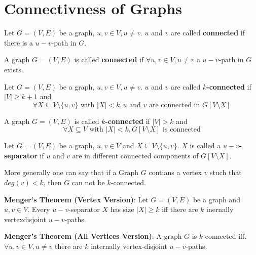 \section{Connectivness of Graphs}

\begin{definition}
	Let $G = (V, E)$ be a graph, $u, v \in V, u \neq v$. $u$ and $v$ are called \textbf{connected} if there is a $u-v$-path in $G$.
\end{definition}

\begin{definition}
	A graph $G = (V, E)$ is called \textbf{connected} if $\forall u, v \in V, u \neq v$ a $u-v$-path in $G$ exists.
\end{definition}

\begin{definition}
	Let $G = (V, E)$ be a graph, $u, v \in V, u \neq v$. $u$ and $v$ are called \textbf{$k$-connected} if $|V|\ge k+1$ and
	$$\forall X \subseteq V \setminus \{u, v\} \text{ with } |X| \lt k, u \text{ and } v \text{ are connected in } G[V \setminus X]$$
\end{definition}

\begin{definition}
	A graph $G = (V, E)$ is called \textbf{$k$-connected} if $|V| \gt k$ and
	$$\forall X \subseteq V \text{ with } |X| \lt k, G[V \setminus X] \text{ is connected}$$
\end{definition}

\begin{definition}
	Let $G = (V, E)$ be a graph, $u, v \in V$ and $X \subseteq V \setminus \{u, v\}$. $X$ is called a \textbf{$u-v$-separator} if $u$ and $v$ are in different connected components of $G[V \setminus X]$.
\end{definition}

\begin{remark}
	More generally one can say that if a Graph $G$ contians a vertex $v$ stuch that $deg(v) \lt k$, then $G$ can
	not be $k$-connected.
\end{remark}

\begin{theorem}
	\textbf{Menger's Theorem (Vertex Version)}: Let $G = (V, E)$ be a graph and $u, v \in V$. Every $u-v$-separator $X$ has size $\mid X \mid \geq k$ iff there are $k$ inernally vertexdisjoint $u-v$-paths.
\end{theorem}

\begin{theorem}
	\textbf{Menger's Theorem (All Vertices Version)}: A graph $G$ is $k$-connected iff. $\forall u, v \in V, u \neq v$ there are $k$ internally vertex-disjoint $u-v$-paths.
\end{theorem}

